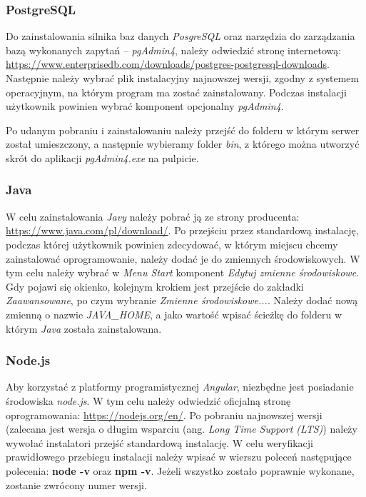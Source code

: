 \documentclass[twoside]{projektInzynierskiMS}
\numberwithin{figure}{section}
\begin{document}
\subsubsection{PostgreSQL}
Do zainstalowania silnika baz danych \textit{PosgreSQL} oraz narzędzia do zarządzania bazą wykonanych zapytań -- \textit{pgAdmin4}, należy odwiedzić stronę internetową:
\url{https://www.enterprisedb.com/downloads/postgres-postgresql-downloads}.
Następnie należy wybrać plik instalacyjny najnowszej wersji, zgodny z systemem operacyjnym, na którym program ma zostać zainstalowany. Podczas instalacji użytkownik powinien wybrać komponent opcjonalny \textit{pgAdmin4}.

Po udanym pobraniu i zainstalowaniu należy przejść do folderu w którym serwer został umieszczony, a następnie wybieramy folder \textit{bin}, z którego można utworzyć skrót do aplikacji \textit{pgAdmin4.exe} na pulpicie.

\subsubsection{Java}
W celu zainstalowania \textit{Javy} należy pobrać ją ze strony producenta:
\url{https://www.java.com/pl/download/}. Po przejściu przez standardową instalację, podczas której użytkownik powinien zdecydować, w którym miejscu chcemy zainstalować oprogramowanie, należy dodać je do zmiennych środowiskowych. W tym celu należy wybrać w \textit{Menu Start} komponent \textit{Edytuj zmienne środowiskowe}. Gdy pojawi się okienko, kolejnym krokiem jest przejście do zakładki \textit{Zaawansowane}, po czym wybranie \textit{Zmienne środowiskowe...}. Należy dodać nową zmienną o nazwie \textit{JAVA\_HOME}, a jako wartość wpisać ścieżkę do folderu w którym \textit{Java} została zainstalowana.

\subsubsection{Node.js}
Aby korzystać z platformy programistycznej \textit{Angular}, niezbędne jest posiadanie środowiska \textit{node.js}. W tym celu należy odwiedzić oficjalną stronę oprogramowania: \url{https://nodejs.org/en/}. Po pobraniu najnowszej wersji (zalecana jest wersja o długim wsparciu (ang. \textit{Long Time Support (LTS)}) należy wywołać instalator\linebreak i przejść standardową instalację. W celu weryfikacji prawidłowego przebiegu instalacji należy wpisać w wierszu poleceń następujące polecenia: \textbf{node -v} oraz \textbf{npm -v}. Jeżeli wszystko zostało poprawnie wykonane, zostanie zwrócony numer wersji.
\end{document}
